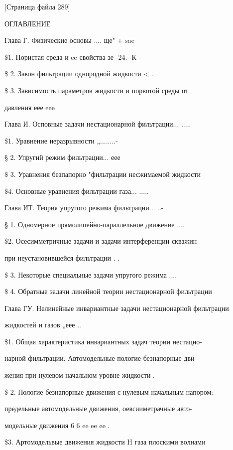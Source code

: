 \documentclass[
  11pt,
]{article}
\begin{document}
\begingroup\small\setlength{\parindent}{0pt}\setlength{\parskip}{1pt}
{[}Страница файла 289{]}\par
ОГЛАВЛЕНИЕ\par
\smallskip
Глава Г. Физические основы .... ще" + sae\par
\$1. Пористая среда и ee свойства зе -24.- К -\par
\$ 2. Закон фильтрации однородной жидкости \textless{} .\par
\$ 3. Зависимость параметров жидкости и порвотой среды от\par
давления еее eee\par
\smallskip
Глава И. Осповные задачи нестационарной фильтрации... .....\par
\smallskip
\$1. Уравнение неразрывности „........-\par
\smallskip
§ 2. Упругий режим фильтрации... еее\par
\$ 3. Уравнения безпапорно "фильтрации несжимаемой жидкости\par
\$4. Основные уравнения фильтрации газа... .....\par
\smallskip
Глава ИТ. Теория упругого режима фильтрации... ..-\par
\smallskip
§ 1. Одномерное прямолипейно-параллельное движение ....\par
\$2. Осесимметричные задачи и задачи интерференции скважин\par
при неустановившейся фильтрации . .\par
\smallskip
\$ 3. Некоторые специальные задачи упругого режнма ....\par
\$ 4. Обратные задачи линейной теории нестационарной фильтрации\par
\smallskip
Глава ГУ. Нелинейные инвариантные задачи нестационарной фильтрации\par
жидкостей и газов „еее ..\par
\smallskip
\$1. Общая характеристика инвариантных задач теории нестацио-\par
нарной фильтрации. Автомодельные пологие безнапорные дви-\par
жения при нулевом начальном уровне жидкости .\par
\$ 2. Пологие безнапорные движения с нулевым начальным напором:\par
предельные автомодельные движения, оевсииметрачные авто-\par
модельные движения 6 6 ee ee ee .\par
\$3. Артомодельвые движения жидкости H газа плоскими волнами\par
\end{document}
